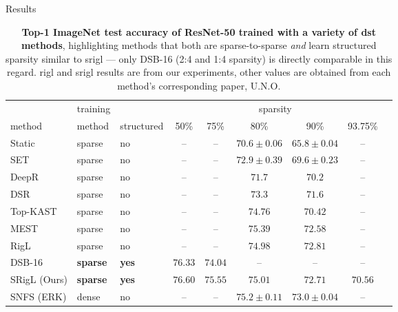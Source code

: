 \documentclass[final]{beamer}
\newlength{\sepwidth}
\newlength{\colwidth}
\newcommand{\separatorcolumn}{\begin{column}{\sepwidth}\end{column}}
\begin{document}
\begin{frame}[t]
\begin{columns}[t]
\begin{column}{\colwidth}
\end{column}
\separatorcolumn
\begin{column}{\colwidth}
  \begin{block}{Results}
  \begin{table}[p]
  \vspace{-1em}
    \begin{threeparttable}
    \begin{center}
        \caption{\textbf{Top-1 ImageNet test accuracy of ResNet-50 trained with a variety of \gls{dst} methods}, highlighting methods that both are sparse-to-sparse \emph{and} learn structured sparsity similar to \gls{srigl} --- only DSB-16 (2:4 and 1:4  sparsity) is directly comparable in this regard. \gls{rigl} and \gls{srigl} results are from our experiments, other values are obtained from each method's corresponding paper, U.N.O.}\label{table:imagenet_benchmarks}
        \begin{tabular}{@{}p{6.0em}p{4.0em}p{5.5em}cccccc@{}}\toprule
        & training &  & \multicolumn{5}{c}{sparsity} \\
        \cmidrule(lr){4-8}
        method & method & structured & 50\% & 75\% & 80\% & 90\%  & 93.75\% \\
        \midrule
        Static\tnote{\textasteriskcentered} & sparse & no & -- & -- & $70.6\pm 0.06$ & $65.8\pm 0.04$ & -- \\ 
        SET\tnote{\textasteriskcentered} & sparse & no & -- & -- & $72.9\pm 0.39$ & $69.6\pm 0.23$ & -- \\  
        DeepR\tnote{\S} & sparse & no & -- & -- & $71.7$ & $70.2$ & -- \\ 
        DSR & sparse & no & -- & -- & $73.3$ & $71.6$ & -- \\  
        Top-KAST\tnote{\textdaggerdbl} & sparse & no & -- & -- & $74.76$ & $70.42$ & -- \\ 
        MEST\tnote{\textdagger} & sparse & no & -- & -- & $\mathbf{75.39}$ & $72.58$ & -- \\ 
        RigL & sparse & no & -- & -- & $74.98$ & $\mathbf{72.81}$ & -- \\ 
        DSB-16 & \textbf{sparse} & \textbf{yes} & $76.33$ & $74.04$ & -- & -- & -- \\ 
        SRigL (Ours) & \textbf{sparse} & \textbf{yes} & $\mathbf{76.60}$ & $\mathbf{75.55}$ & $75.01$ & $72.71$ & $70.56$ \\ 
        \cmidrule{1-8}
        SNFS (ERK)\tnote{\textasteriskcentered} & dense & no & -- & -- & $75.2\pm 0.11$ & $73.0\pm 0.04$ & -- \\ 

\end{tabular}
\end{center}
\end{threeparttable}
\end{table}
\end{block}
\end{column}
\end{columns}
\end{frame}
\end{document}
